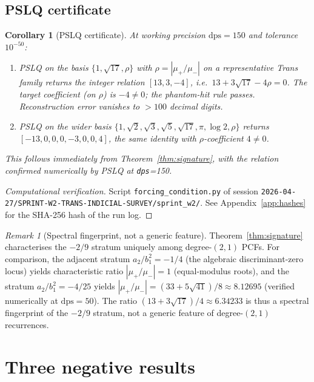 \documentclass[11pt]{amsart}
\newtheorem{corollary}[theorem]{Corollary}
\theoremstyle{definition}
\theoremstyle{remark}
\newtheorem{remark}[theorem]{Remark}
\newcommand{\dps}{\mathrm{dps}}
\begin{document}
\subsection{PSLQ certificate}

\begin{corollary}[PSLQ certificate]\label{thm:pslq}
At working precision $\dps = 150$ and tolerance $10^{-50}$:
\begin{enumerate}[label={\upshape(\arabic*)}]
\item PSLQ on the basis
$\{1,\sqrt{17},\rho\}$ with $\rho = |\mu_+/\mu_-|$ on a
representative Trans family returns the integer relation
$[13,3,-4]$, i.e.\ $13 + 3\sqrt{17} - 4\rho = 0$.  The target
coefficient (on $\rho$) is $-4 \ne 0$; the phantom-hit rule
passes.  Reconstruction error vanishes to $> 100$ decimal digits.
\item PSLQ on the wider basis
$\{1,\sqrt{2},\sqrt{3},\sqrt{5},\sqrt{17},\pi,\log 2,\rho\}$
returns $[-13,0,0,0,-3,0,0,4]$, the same identity with
$\rho$-coefficient $4 \ne 0$.
\end{enumerate}
This follows immediately from Theorem~\ref{thm:signature}, with the
relation confirmed numerically by PSLQ at \texttt{dps}=150.
\end{corollary}
\begin{proof}[Computational verification]
Script \texttt{forcing\_condition.py} of session
\texttt{2026-04-27/SPRINT-W2-TRANS-INDICIAL-SURVEY/sprint\_w2/}.  See
Appendix~\ref{app:hashes} for the SHA-256 hash of the run log.
\end{proof}

\begin{remark}[Spectral fingerprint, not a generic feature]
\label{rem:spectral-fingerprint}
Theorem~\ref{thm:signature} characterises the $-2/9$ stratum
uniquely among degree-$(2,1)$ PCFs.  For comparison, the adjacent
stratum $a_2/b_1^2 = -1/4$ (the algebraic
discriminant-zero locus) yields characteristic ratio
$|\mu_+/\mu_-| = 1$ (equal-modulus roots), and the stratum
$a_2/b_1^2 = -4/25$ yields $|\mu_+/\mu_-| = (33+5\sqrt{41})/8
\approx 8.12695$ (verified numerically at $\dps=50$).  The ratio
$(13+3\sqrt{17})/4 \approx 6.34233$ is thus a spectral fingerprint
of the $-2/9$ stratum, not a generic feature of degree-$(2,1)$
recurrences.
\end{remark}

\section{Three negative results}\label{sec:negative}
\end{document}
